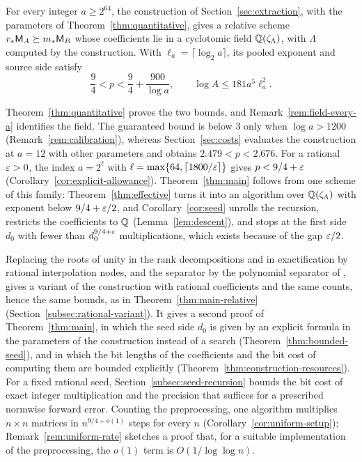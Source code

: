 \begin{theorem}\label{thm:main-relative}
For every integer \(a\ge2^{64}\), the construction of
Section~\ref{sec:extraction}, with the parameters of
Theorem~\ref{thm:quantitative}, gives a relative scheme
\(r_*\mathsf M_A\succeq m_*\mathsf M_B\) whose coefficients lie in a cyclotomic field
\(\mathbb Q(\zeta_\Lambda)\), with \(\Lambda\) computed by the construction.
With \(\ell_a=\lceil\log_2a\rceil\), its pooled exponent and source side
satisfy
\[
 \frac94<p<\frac94+\frac{900}{\log a},
 \qquad
 \log A\le181a^5\ell_a^2.
\]
\end{theorem}

Theorem~\ref{thm:quantitative} proves the two bounds, and
Remark~\ref{rem:field-every-a} identifies the field. The guaranteed bound
is below \(3\) only when \(\log a>1200\)
(Remark~\ref{rem:calibration}), whereas Section~\ref{sec:costs}
evaluates the construction at \(a=12\) with other parameters and obtains
\(2.479<p<2.676\). For a rational \(\varepsilon>0\), the index \(a=2^\ell\) with
\(\ell=\max\{64,\lceil1800/\varepsilon\rceil\}\) gives \(p<9/4+\varepsilon\)
(Corollary~\ref{cor:explicit-allowance}). Theorem~\ref{thm:main} follows
from one scheme of this family: Theorem~\ref{thm:effective} turns it into
an algorithm over \(\mathbb Q(\zeta_\Lambda)\) with exponent below
\(9/4+\varepsilon/2\), and Corollary~\ref{cor:seed} unrolls the recursion,
restricts the coefficients to \(\mathbb Q\) (Lemma~\ref{lem:descent}), and
stops at the first side \(d_0\) with fewer than \(d_0^{9/4+\varepsilon}\)
multiplications, which exists because of the gap \(\varepsilon/2\).

Replacing the roots of unity in the rank decompositions and in
exactification by rational interpolation nodes, and the separator by the
polynomial separator of \citet{Lu26}, gives a variant
of the construction with rational coefficients and the same counts, hence
the same bounds, as in Theorem~\ref{thm:main-relative}
(Section~\ref{subsec:rational-variant}).
It gives a second proof of Theorem~\ref{thm:main}, in which the seed
side \(d_0\) is given by an explicit formula in the parameters of the
construction instead of a search
(Theorem~\ref{thm:bounded-seed}), and in which the bit lengths of the
coefficients and the bit cost of computing them are bounded explicitly
(Theorem~\ref{thm:construction-resources}). For a fixed rational seed,
Section~\ref{subsec:seed-recursion} bounds the bit cost of exact integer
multiplication and the precision that suffices for a prescribed normwise
forward error. Counting the preprocessing, one algorithm multiplies
\(n\times n\) matrices in \(n^{9/4+o(1)}\) steps for every \(n\)
(Corollary~\ref{cor:uniform-setup}); Remark~\ref{rem:uniform-rate}
sketches a proof that, for a suitable implementation of the
preprocessing, the \(o(1)\) term is \(O(1/\log\log n)\).

